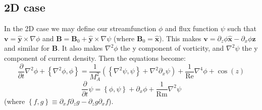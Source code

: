\documentclass[aps,pop,preprint]{revtex4}
\begin{document}
	\subsection{2D case} \label{derivation:subsec:2d}
	In the 2D case we may define our streamfunction $\phi$ and flux function $\psi$ such that $\mathbf{v} = \hat{\mathbf{y}} \times \nabla \phi$ and $\mathbf{B} = \mathbf{B}_0 + \hat{\mathbf{y}} \times \nabla \psi$ (where $\mathbf{B}_0 = \hat{\mathbf{x}}$). 
	This makes $\mathbf{v} = \partial_z \phi \hat{\mathbf{x}} - \partial_x \phi \hat{\mathbf{z}}$ and similar for $\mathbf{B}$. 
	It also makes $\nabla^2 \phi$ the y component of vorticity, and $\nabla^2 \psi$ the y component of current density. 
	Then the equations become:
	\begin{equation}
	\frac{\partial}{\partial t} \nabla^2 \phi + \left\{\nabla^2 \phi, \phi \right\} = \frac{1}{M_A^2}\left(\left\{\nabla^2 \psi, \psi \right\} + \nabla^2 \partial_x \psi \right) + \frac{1}{\mathrm{Re}}\nabla^4 \phi + \cos(z)
	\end{equation}
	\begin{equation}
	\frac{\partial}{\partial t} \psi = \left\{ \phi, \psi \right\} + \partial_x \phi + \frac{1}{\mathrm{Rm}}\nabla^2 \psi
	\end{equation}
	(where $\left\{f, g\right\} \equiv \partial_x f \partial_z g - \partial_z g \partial_x f$).
\end{document}
